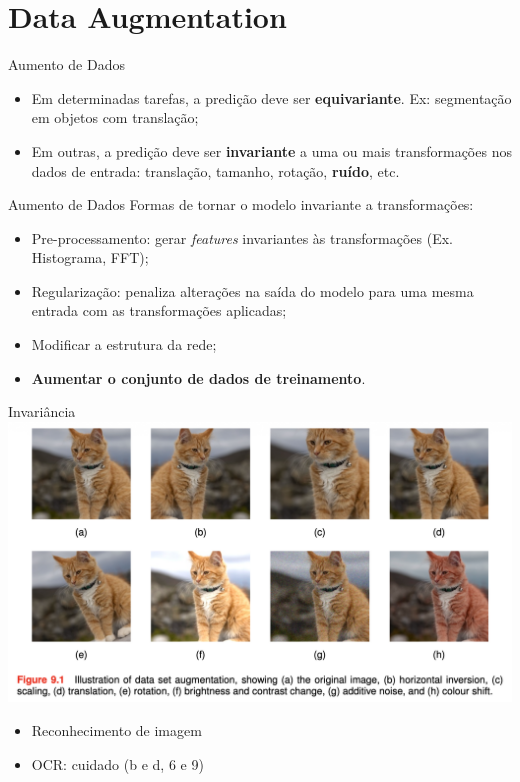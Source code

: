 \documentclass{beamer}
\begin{document}
\section{Data Augmentation}

\begin{frame}{Aumento de Dados}
\begin{itemize}
  
  \item Em determinadas tarefas, a predição deve ser \textbf{equivariante}. Ex: segmentação em objetos com translação;

  \item Em outras, a predição deve ser \textbf{invariante} a uma ou mais transformações nos dados de entrada: translação, tamanho, rotação, \textbf{ruído}, etc.
\end{itemize}
\end{frame}

\begin{frame}{Aumento de Dados}
Formas de tornar o modelo invariante a transformações:
    \begin{itemize}
      \item Pre-processamento: gerar \textit{features} invariantes às transformações (Ex. Histograma, FFT);
      \item Regularização: penaliza alterações na saída do modelo para uma mesma entrada com as transformações aplicadas;
      \item Modificar a estrutura da rede;
      \item \textbf{Aumentar o conjunto de dados de treinamento}.
    \end{itemize}
\end{frame}


\begin{frame}{Invariância}
\centering
\includegraphics[width=\textwidth,height=0.5\textheight,keepaspectratio]{imgs/bishop_example/8.png}
\begin{itemize}
  \item Reconhecimento de imagem 
\item OCR: cuidado (b e d, 6 e 9)
\end{itemize}
\end{frame}
\end{document}
